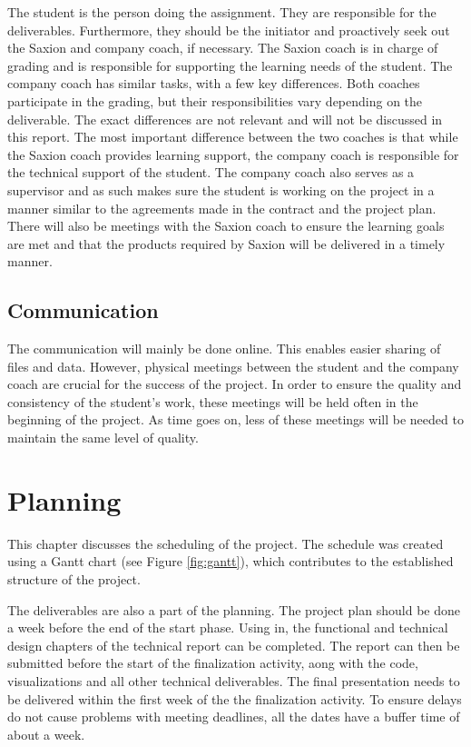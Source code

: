 \documentclass{report}
\begin{document}
	The student is the person doing the assignment. They are responsible for the deliverables. Furthermore, they should be the initiator and proactively seek out the Saxion and company coach, if necessary. The Saxion coach is in charge of grading and is responsible for supporting the learning needs of the student. The company coach has similar tasks, with a few key differences. Both coaches participate in the grading, but their responsibilities vary depending on the deliverable. The exact differences are not relevant and will not be discussed in this report. The most important difference between the two coaches is that while the Saxion coach provides learning support, the company coach is responsible for the technical support of the student. The company coach also serves as a supervisor and as such makes sure the student is working on the project in a manner similar to the agreements made in the contract and the project plan. There will also be meetings with the Saxion coach to ensure the learning goals are met and that the products required by Saxion will be delivered in a timely manner.
	
	\section{Communication} \label{communication}
	The communication will mainly be done online. This enables easier sharing of files and data. However, physical meetings between the student and the company coach are crucial for the success of the project. In order to ensure the quality and consistency of the student's work, these meetings will be held often in the beginning of the project. As time goes on, less of these meetings will be needed to maintain the same level of quality.
	
	\chapter{Planning}\label{plan}
	This chapter discusses the scheduling of the project. The schedule was created using a Gantt chart (see Figure \ref{fig:gantt}), which contributes to the established structure of the project.
	
	The deliverables are also a part of the planning. The project plan should be done a week before the end of the start phase. Using in, the functional and technical design chapters of the technical report can be completed. The report can then be submitted before the start of the finalization activity, aong with the code, visualizations and all other technical deliverables. The final presentation needs to be delivered within the first week of the the finalization activity. To ensure delays do not cause problems with meeting deadlines, all the dates have a buffer time of about a week.
	
\end{document}
